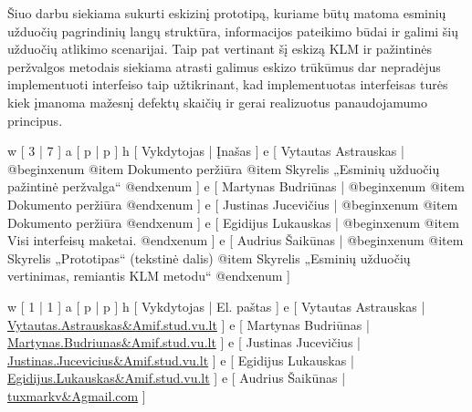 
Šiuo darbu siekiama sukurti eskizinį prototipą, kuriame būtų matoma esminių
užduočių pagrindinių langų struktūra, informacijos pateikimo būdai ir galimi
šių užduočių atlikimo scenarijai. Taip pat vertinant šį eskizą KLM ir pažintinės
peržvalgos metodais siekiama atrasti galimus eskizo trūkūmus dar nepradėjus
implementuoti interfeiso taip užtikrinant, kad implementuotas interfeisas
turės kiek įmanoma mažesnį defektų skaičių ir gerai realizuotus panaudojamumo
principus.

\xtable
{
  w [ 3  | 7 ]
  a [ p  | p ]
  h [ Vykdytojas | Įnašas ]
  e [ Vytautas Astrauskas
  | @begin{xenum} 
      @item Dokumento peržiūra
      @item Skyrelis „Esminių užduočių pažintinė peržvalga“
    @end{xenum}
  ]
  e [ Martynas Budriūnas
  | @begin{xenum} 
      @item Dokumento peržiūra
    @end{xenum}
  ]
  e [ Justinas Jucevičius 
  | @begin{xenum} 
      @item Dokumento peržiūra
    @end{xenum}
  ]
  e [ Egidijus Lukauskas 
  | @begin{xenum} 
      @item Visi interfeisų maketai.
    @end{xenum}
  ]
  e [ Audrius Šaikūnas 
  | @begin{xenum} 
      @item Skyrelis „Prototipas“ (tekstinė dalis)
      @item Skyrelis „Esminių užduočių vertinimas, remiantis KLM metodu“
    @end{xenum}
  ]
}

\xtableu
{
  w [ 1 | 1 ]
  a [ p | p ]
  h [ Vykdytojas | El. paštas ]
  e [ Vytautas Astrauskas | \url{Vytautas.Astrauskas&Amif.stud.vu.lt} ]
  e [ Martynas Budriūnas  | \url{Martynas.Budriunas&Amif.stud.vu.lt} ]
  e [ Justinas Jucevičius | \url{Justinas.Jucevicius&Amif.stud.vu.lt} ]
  e [ Egidijus Lukauskas  | \url{Egidijus.Lukauskas&Amif.stud.vu.lt} ]
  e [ Audrius Šaikūnas    | \url{tuxmarkv&Agmail.com} ]
}
